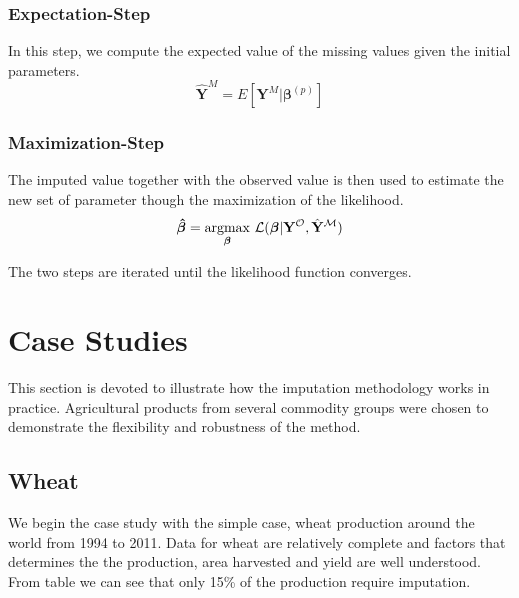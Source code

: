 \documentclass[nojss]{jss}\usepackage[]{graphicx}\usepackage[]{color}
\begin{document}
\subsubsection{Expectation-Step}
In this step, we compute the expected value of the missing values
given the initial parameters.
\begin{equation}
  \mathbf{\hat{Y}}^M = E[\mathbf{Y}^M|\boldsymbol{\beta}^{(p)}]
\end{equation}

\subsubsection{Maximization-Step}
The imputed value together with the observed value is then used to
estimate the new set of parameter though the maximization of the
likelihood.
\begin{equation}
  \boldsymbol{\hat{\beta}} = \underset{\boldsymbol{\beta}}
             {\mathrm{argmax}}
             ~\cal{L}(\boldsymbol{\beta}|\mathbf{Y}^O,
             \mathbf{\hat{Y}}^M)
\end{equation}

The two steps are iterated until the likelihood function converges.



\section{Case Studies}
This section is devoted to illustrate how the imputation methodology
works in practice. Agricultural products from several commodity groups
were chosen to demonstrate the flexibility and robustness of the
method.

\subsection{Wheat}
We begin the case study with the simple case, wheat production around
the world from 1994 to 2011. Data for wheat are relatively complete
and factors that determines the the production, area harvested and
yield are well understood. From table we can see that only 15\% of the
production require imputation.
\end{document}

